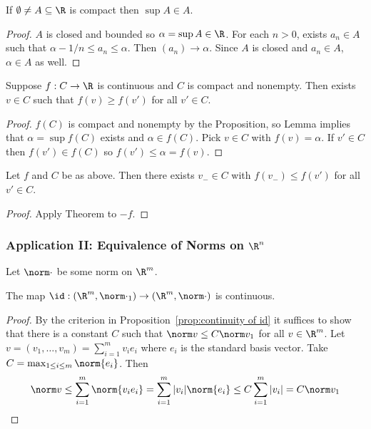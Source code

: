 \documentclass[a4paper]{article}
\theoremstyle{definition}
\begin{document}
\begin{lemma}
  If \(\emptyset \neq A \subseteq \R \) is compact then \(\sup A \in A\).
\end{lemma}

\begin{proof}
  \(A\) is closed and bounded so \(\alpha = \sup A\in \R\). For each \(n>0\), exists \(a_n \in A\) such that \(\alpha-1/n \leq a_n \leq \alpha\). Then \((a_n)\to \alpha\). Since \(A\) is closed and \(a_n \in A\), \(\alpha\in A\) as well.
\end{proof}
 
\begin{theorem}
  Suppose \(f:C\to \R\)  is continuous and \(C\) is compact and nonempty. Then exists \(v\in C\) such that \(f(v) \geq f(v')\) for all \(v' \in C\).
\end{theorem}

\begin{proof}
  \(f(C)\) is compact and nonempty by the Proposition, so Lemma implies that \(\alpha = \sup f(C)\) exists and \(\alpha\in f(C)\). Pick \(v\in C\) with \(f(v) = \alpha\). If \(v'\in C\) then \(f(v') \in f(C)\) so \(f(v') \leq \alpha = f(v)\).
\end{proof}

\begin{corollary}
  Let \(f\) and \(C\) be as above. Then there exists \(v_-\in C\) with \(f(v_-) \leq f(v')\) for all \(v' \in C\).
\end{corollary}

\begin{proof}
  Apply Theorem to \(-f\).
\end{proof}

\subsubsection{Application II: Equivalence of Norms on \texorpdfstring{\(\R^n\)}{R\^{}n}}

Let \(\norm \cdot\) be some norm on \(\R^m\).
  
\begin{lemma}
  The map \(\id: (\R^m, \norm \cdot_1) \to (\R^m, \norm \cdot)\) is continuous.
\end{lemma}

\begin{proof}
  By the criterion in Proposition~\ref{prop:continuity of id} it suffices to show that there is a constant \(C\) such that \(\norm v \leq C \norm v_1\) for all \(v\in \R^m\). Let \(v = (v_1,\dots,v_m) = \sum_{i=1}^{m}v_ie_i \) where \(e_i\) is the standard basis vector. Take \(C = \max_{1\leq i\leq m}\norm{e_i}\). Then
  \[
    \norm v \leq \sum_{i=1}^{m}\norm{v_ie_i} = \sum_{i=1}^{m}|v_i| \norm{e_i} \leq C \sum_{i=1}^{m}|v_i| = C \norm v_1
  \]
\end{proof}
\end{document}
